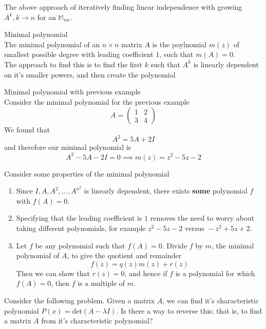 \documentclass[journal, letterpaper]{IEEEtran}
\begin{document}
    The above approach of iteratively finding linear independence with growing $A^k, k \to n$ for an $\mathbb{M}_{nn}$.
    \begin{myboxr}{Minimal polynomial} \\ 
        The minimal polynomial of an $n \times n$ matrix $A$ is the poylnomial $m(z)$ of smallest possible degree with leading coefficient $1$, such that $m(A) = 0$.
        \newline \\ 
        The approach to find this is to find the first $k$ such that $A^{k}$ is linearly dependent on it's smaller powers, and then create the polynomial
    \end{myboxr}
    \begin{myboxg}{Minimal polynomial with previous example} \\
        Consider the minimal polynomial for the previous example
        $$ A = \begin{pmatrix}
            1 & 2 \\ 3 & 4
        \end{pmatrix}$$
        We found that
        $$ A^2 = 5A + 2I$$
        and therefore our minimal polynomial is
        $$ A^2 - 5A - 2I = 0 \implies m(z) = z^2 - 5z - 2$$
    \end{myboxg}
    Consider some properties of the minimal polynomial
    \begin{enumerate}
        \item Since $I, A, A^2, \dots, A^{n^2}$ is linearly dependent, there exists \textbf{some} polynomial $f$ 
        with $f(A) = 0$.
        \item Specifying that the leading coefficient is $1$ removes the need to worry about taking different polynomials, for example $z^2 - 5z - 2 \text{ versus } -z^2 + 5z + 2$.
        \item Let $f$ be any polynomial such that $f(A) = 0$. Divide $f$ by $m$, the minimal polynomial of $A$, to give the quotient and remainder
        $$ f(z) = q(z)m(z) + r(z)$$
        Then we can show that $r(z) = 0$, and hence if $f$ is a polynomial for which $f(A) = 0$, then $f$ is a multiple of $m$.
    \end{enumerate}
    \begin{myboxg}{}
    Consider the following problem. Given a matrix $A$, we can find it's characteristic polynomial $P(x) = \text{det}(A - \lambda I)$. Is there a way to reverse this; that is, to find a matrix $A$ from it's characteristic polynomial?
    \end{myboxg}
\end{document}
